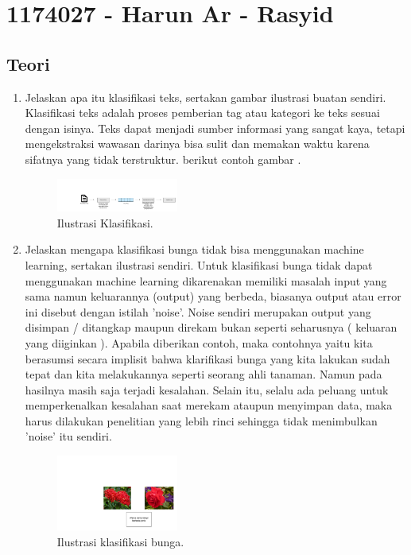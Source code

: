 \section{1174027 - Harun Ar - Rasyid}
\subsection{Teori}
\begin{enumerate}
	\item Jelaskan apa itu klasifikasi teks, sertakan gambar ilustrasi buatan sendiri.
	\hfill\break
	Klasiﬁkasi teks adalah proses pemberian tag atau kategori ke teks sesuai dengan isinya. Teks dapat menjadi sumber informasi yang sangat kaya, tetapi mengekstraksi wawasan darinya bisa sulit dan memakan waktu karena sifatnya yang tidak terstruktur. berikut contoh gambar .
	\begin{figure}[H]
		\centering
		\includegraphics[width=4cm]{figures/1174027/4/1.png}
		\caption{Ilustrasi Klasiﬁkasi.}
	\end{figure}
	\item Jelaskan mengapa klasifikasi bunga tidak bisa menggunakan machine learning, sertakan ilustrasi sendiri.
	\hfill\break
    Untuk klasiﬁkasi bunga tidak dapat menggunakan machine learning dikarenakan memiliki masalah input yang sama namun keluarannya (output) yang berbeda, biasanya output atau error ini disebut dengan istilah ’noise’. Noise sendiri merupakan output yang disimpan / ditangkap maupun direkam bukan seperti seharusnya ( keluaran yang diiginkan ). Apabila diberikan contoh, maka contohnya yaitu kita berasumsi secara implisit bahwa klariﬁkasi bunga yang kita lakukan sudah tepat dan kita melakukannya seperti seorang ahli tanaman. Namun pada hasilnya masih saja terjadi kesalahan. Selain itu, selalu ada peluang untuk memperkenalkan kesalahan saat merekam ataupun menyimpan data, maka harus dilakukan penelitian yang lebih rinci sehingga tidak menimbulkan ’noise’ itu sendiri.
	\begin{figure}[H]
		\centering
		\includegraphics[width=4cm]{figures/1174027/4/2.png}
		\caption{Ilustrasi klasifikasi bunga.}

\end{figure}
\end{enumerate}
